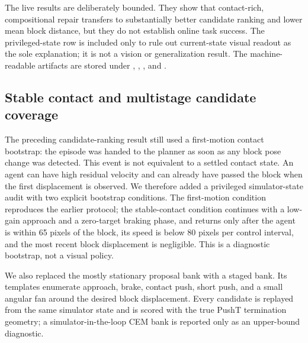 \documentclass{article}
\begin{document}
The live results are deliberately bounded. They show that contact-rich,
compositional repair transfers to substantially better candidate ranking and
lower mean block distance, but they do not establish online task success. The
privileged-state row is included only to rule out current-state visual readout
as the sole explanation; it is not a vision or generalization result. The
machine-readable artifacts are stored under
,
,
,
and
.

\subsection{Stable contact and multistage candidate coverage}
\label{sec:supp-stable-contact-coverage}

The preceding candidate-ranking result still used a first-motion contact
bootstrap: the episode was handed to the planner as soon as any block pose
change was detected.  This event is not equivalent to a settled contact
state.  An agent can have high residual velocity and can already have passed
the block when the first displacement is observed.  We therefore added a
privileged simulator-state audit with two explicit bootstrap conditions.  The
first-motion condition reproduces the earlier protocol; the stable-contact
condition continues with a low-gain approach and a zero-target braking phase,
and returns only after the agent is within 65 pixels of the block, its speed
is below 80 pixels per control interval, and the most recent block displacement
is negligible.  This is a diagnostic bootstrap, not a visual policy.

We also replaced the mostly stationary proposal bank with a staged bank.  Its
templates enumerate approach, brake, contact push, short push, and a small
angular fan around the desired block displacement.  Every candidate is
replayed from the same simulator state and is scored with the true PushT
termination geometry; a simulator-in-the-loop CEM bank is reported only as an
upper-bound diagnostic.
\end{document}
